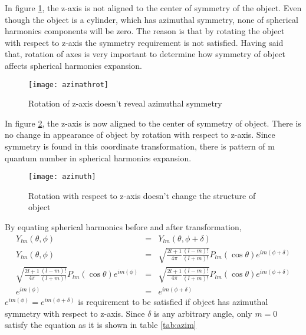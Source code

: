 In figure \ref{fig:azimuthrot}, the z-axis is not aligned to the center of symmetry of the object. Even though the object is a cylinder, which has azimuthal symmetry, none of spherical harmonics components will be zero. The reason is that by rotating the object with respect to z-axis the symmetry requirement is not satisfied. Having said that, rotation of axes is very important to determine  how symmetry of object affects spherical harmonics expansion.
 \begin{figure}[h]
  \centering
  \texttt{[image: azimathrot]}
\caption{Rotation of z-axis doesn't reveal azimuthal symmetry}
\label{fig:azimuthrot}
\end{figure}

In figure \ref{fig:azimuth}, the z-axis is now aligned to the center of symmetry of object. There is no change in appearance of object by rotation with respect to z-axis. Since symmetry is found in this coordinate transformation, there is pattern of m quantum number in spherical harmonics expansion.  
\begin{figure}[h]
  \centering
  \texttt{[image: azimuth]}
\caption{Rotation with respect to z-axis doesn't change the structure of object}
\label{fig:azimuth}
\end{figure}
By equating spherical harmonics before and after transformation,
\begin{eqnarray}
Y_{lm}(\theta,\phi)&=&Y_{lm}(\theta,\phi+\delta) \\ \nonumber
 Y_{lm}(\theta,\phi)&=&\sqrt{\frac{2l+1}{4 \pi}\frac{(l-m)!}{(l+m)!}} P_{lm}(\cos \theta) e^{im\left(\phi+\delta \right)} \\ \nonumber
\sqrt{\frac{2l+1}{4 \pi}\frac{(l-m)!}{(l+m)!}} P_{lm}(\cos \theta) e^{im\left(\phi \right)} &=& \sqrt{\frac{2l+1}{4 \pi}\frac{(l-m)!}{(l+m)!}} P_{lm}(\cos \theta) e^{im\left(\phi+\delta \right)} \\ \nonumber
e^{im\left(\phi\right)} &=& e^{im\left(\phi+\delta \right)}
\end{eqnarray}
$e^{im\left(\phi\right)} = e^{im\left(\phi+\delta \right)}$ is requirement to be satisfied if object has azimuthal symmetry with respect to z-axis. Since $\delta$ is any arbitrary angle, only $m=0$ satisfy the equation as it is shown in table \ref{tab:azim}
